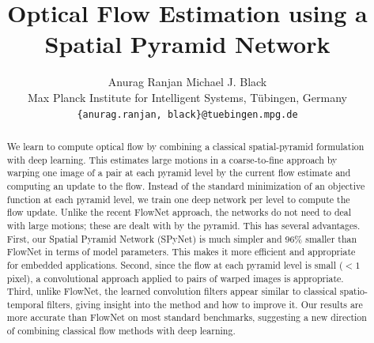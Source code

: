 \documentclass[10pt,twocolumn,letterpaper]{article}
\begin{document}
\title{Optical Flow Estimation using a Spatial Pyramid Network}

\author{Anurag Ranjan \quad \quad Michael J. Black\hspace{0.1in}\\ 
    Max Planck Institute for Intelligent Systems, T\"{u}bingen, Germany\\
    {\tt\small \{anurag.ranjan, black\}@tuebingen.mpg.de} 
       }


\maketitle

\begin{abstract}
We learn to compute optical flow by combining a classical spatial-pyramid formulation with deep learning.
This estimates large motions in a coarse-to-fine approach by
warping one image of a pair at each pyramid level by the current flow estimate and computing an update to the flow.
Instead of the standard minimization of an objective function at each
pyramid level, we train one deep network per level to compute the flow update.
Unlike the recent FlowNet approach, the networks do not need to deal with large motions; these are dealt with by the pyramid.  
This has several advantages. 
First, our Spatial Pyramid Network (SPyNet) is much simpler and  
96\% smaller than FlowNet in terms of model parameters.
This makes it more efficient and appropriate for embedded applications.
Second, since the flow at each pyramid
level is small ($< 1$ pixel), a convolutional approach applied to pairs of warped images is appropriate.
Third, unlike FlowNet, the learned convolution filters appear similar to classical spatio-temporal filters, 
giving insight into the method and how to improve it.
Our results are more accurate than FlowNet on most standard benchmarks, suggesting a new direction of combining classical flow methods with deep learning. 
\end{abstract}
\end{document}
